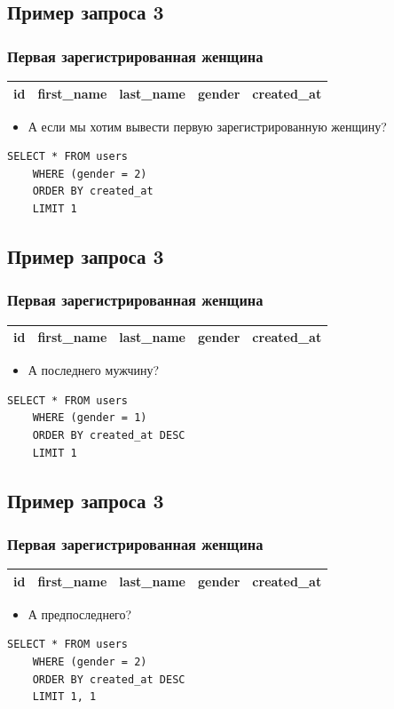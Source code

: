 \documentclass[compress,red]{beamer}
\begin{document}
\subsection{Пример запроса 3}
\begin{frame}[fragile]
  \frametitle{Первая зарегистрированная женщина}
  \begin{tabular}{|c|c|c|c|c|}
  \hline
  id & first\_name & last\_name & gender & created\_at\\
  \hline
  \end{tabular}
  \begin{itemize}
    \item А если мы хотим вывести первую зарегистрированную женщину?
  \end{itemize}
  \scriptsize{
  \begin{lstlisting}[label=sql4,caption=SELECT]
    SELECT * FROM users
    WHERE (gender = 2)
    ORDER BY created_at
    LIMIT 1
  \end{lstlisting}
  }
\end{frame}

\subsection{Пример запроса 3}
\begin{frame}[fragile]
  \frametitle{Первая зарегистрированная женщина}
  \begin{tabular}{|c|c|c|c|c|}
  \hline
  id & first\_name & last\_name & gender & created\_at\\
  \hline
  \end{tabular}
  \begin{itemize}
    \item А последнего мужчину?
  \end{itemize}
  \scriptsize{
  \begin{lstlisting}[label=sql5,caption=SELECT]
    SELECT * FROM users
    WHERE (gender = 1)
    ORDER BY created_at DESC
    LIMIT 1
  \end{lstlisting}
  }
\end{frame}

\subsection{Пример запроса 3}
\begin{frame}[fragile]
  \frametitle{Первая зарегистрированная женщина}
  \begin{tabular}{|c|c|c|c|c|}
  \hline
  id & first\_name & last\_name & gender & created\_at\\
  \hline
  \end{tabular}
  \begin{itemize}
    \item А предпоследнего?
  \end{itemize}
  \scriptsize{
  \begin{lstlisting}[label=sql6,caption=SELECT]
    SELECT * FROM users
    WHERE (gender = 2)
    ORDER BY created_at DESC
    LIMIT 1, 1
  \end{lstlisting}
  }
\end{frame}
\end{document}
